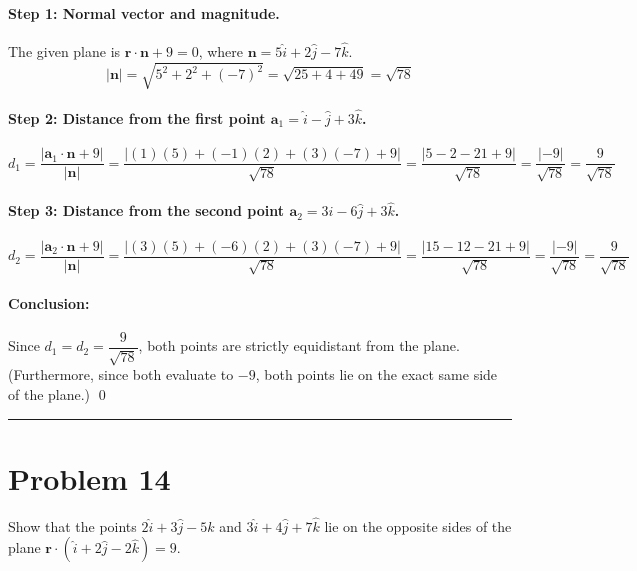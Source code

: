 \documentclass[11pt,a4paper]{article}
\begin{document}
\paragraph{Step 1: Normal vector and magnitude.}
The given plane is $\mathbf{r}\cdot\mathbf{n} + 9 = 0$, where $\mathbf{n} = 5\hat{i} + 2\hat{j} - 7\hat{k}$.
$$|\mathbf{n}| = \sqrt{5^2 + 2^2 + (-7)^2} = \sqrt{25 + 4 + 49} = \sqrt{78}$$

\paragraph{Step 2: Distance from the first point $\mathbf{a}_1 = \hat{i} - \hat{j} + 3\hat{k}$.}
$$d_1 = \frac{|\mathbf{a}_1 \cdot \mathbf{n} + 9|}{|\mathbf{n}|} = \frac{|(1)(5) + (-1)(2) + (3)(-7) + 9|}{\sqrt{78}} = \frac{|5 - 2 - 21 + 9|}{\sqrt{78}} = \frac{|-9|}{\sqrt{78}} = \frac{9}{\sqrt{78}}$$

\paragraph{Step 3: Distance from the second point $\mathbf{a}_2 = 3\hat{i} - 6\hat{j} + 3\hat{k}$.}
$$d_2 = \frac{|\mathbf{a}_2 \cdot \mathbf{n} + 9|}{|\mathbf{n}|} = \frac{|(3)(5) + (-6)(2) + (3)(-7) + 9|}{\sqrt{78}} = \frac{|15 - 12 - 21 + 9|}{\sqrt{78}} = \frac{|-9|}{\sqrt{78}} = \frac{9}{\sqrt{78}}$$

\paragraph{Conclusion:}
Since $d_1 = d_2 = \dfrac{9}{\sqrt{78}}$, both points are strictly equidistant from the plane. (Furthermore, since both evaluate to $-9$, both points lie on the exact same side of the plane.) \qed

\vspace{0.4cm}
\hrule
\vspace{0.4cm}

\section{Problem 14}
\begin{problembox}[Problem 14]
Show that the points $2\hat{i} + 3\hat{j} - 5\hat{k}$ and $3\hat{i} + 4\hat{j} + 7\hat{k}$ lie on the opposite sides of the plane $\mathbf{r}\cdot(\hat{i} + 2\hat{j} - 2\hat{k}) = 9$.
\end{problembox}
\end{document}
